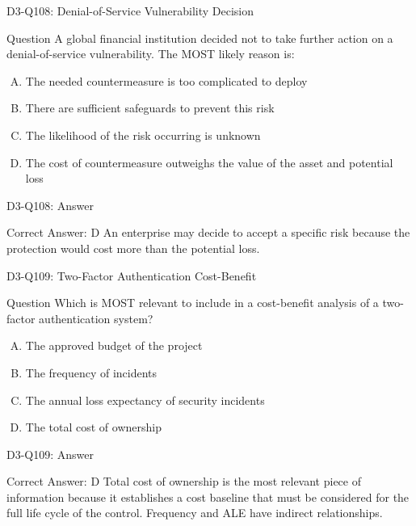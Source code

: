 \documentclass{beamer}
\begin{document}
	\begin{frame}{D3-Q108: Denial-of-Service Vulnerability Decision}
		\begin{block}{Question}
			A global financial institution decided not to take further action on a denial-of-service vulnerability. The MOST likely reason is:
		\end{block}
		\begin{enumerate}[(A)]
			\item The needed countermeasure is too complicated to deploy
			\item There are sufficient safeguards to prevent this risk
			\item The likelihood of the risk occurring is unknown
			\item The cost of countermeasure outweighs the value of the asset and potential loss
		\end{enumerate}
	\end{frame}
	\begin{frame}{D3-Q108: Answer}
		\begin{block}{Correct Answer: D}
			An enterprise may decide to accept a specific risk because the protection would cost more than the potential loss.
		\end{block}
	\end{frame}
	
	\begin{frame}{D3-Q109: Two-Factor Authentication Cost-Benefit}
		\begin{block}{Question}
			Which is MOST relevant to include in a cost-benefit analysis of a two-factor authentication system?
		\end{block}
		\begin{enumerate}[(A)]
			\item The approved budget of the project
			\item The frequency of incidents
			\item The annual loss expectancy of security incidents
			\item The total cost of ownership
		\end{enumerate}
	\end{frame}
	\begin{frame}{D3-Q109: Answer}
		\begin{block}{Correct Answer: D}
			Total cost of ownership is the most relevant piece of information because it establishes a cost baseline that must be considered for the full life cycle of the control. Frequency and ALE have indirect relationships.
		\end{block}
	\end{frame}
	
\end{document}
